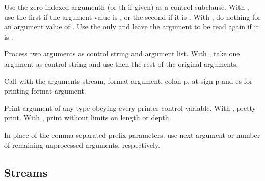 \begin{LIST}{1cm}
\begin{LIST}{.5cm}
    {%
      Use the zero-indexed argumenth (or
      th if given)  as a  control subclause.
      With \kwd{:}, use the first  if the argument value is
      \NIL, or the second  if it is \T. With , do nothing
      for an argument value of \NIL. Use the only  and leave
      the argument to be read again if it is \T.
    }

    {%
      Process two arguments as control string and argument list. With
      , take one argument as control string and use then the
      rest of the original arguments.
    }

    {%
      Call  with the arguments stream, format-ar\-gu\-ment,
      colon-p, at-sign-p and es for printing format-argument.
    }

    {%
      Print argument of any type obeying every printer control variable. With \kwd{:},
      pretty-print. With , print without limits on length or depth.
    }

    {\index{\#}
      In place of the comma-separated prefix parameters: use next
      argument or number of remaining unprocessed arguments, respectively.
    }

  \end{LIST}

\end{LIST}


\subsection{Streams} 

